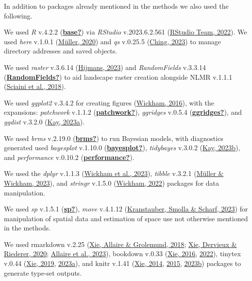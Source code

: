 \documentclass[10pt,a4paper]{article}
\begin{document}
In addition to packages already mentioned in the methods we also used the following.

We used \emph{R} v.4.2.2 (\protect\hyperlink{ref-base}{\textbf{base?}}) via \emph{RStudio} v.2023.6.2.561 (\protect\hyperlink{ref-rstudio}{RStudio Team, 2022}).
We used \emph{here} v.1.0.1 (\protect\hyperlink{ref-here}{Müller, 2020}) and \emph{qs} v.0.25.5 (\protect\hyperlink{ref-qs}{Ching, 2023}) to manage directory addresses and saved objects.

We used \emph{raster} v.3.6.14 (\protect\hyperlink{ref-raster}{Hijmans, 2023}) and \emph{RandomFields} v.3.3.14 (\protect\hyperlink{ref-RandomFields}{\textbf{RandomFields?}}) to aid landscape raster creation alongside NLMR v.1.1.1 (\protect\hyperlink{ref-NLMR}{Sciaini et al., 2018}).

We used \emph{ggplot2} v.3.4.2 for creating figures (\protect\hyperlink{ref-ggplot2}{Wickham, 2016}), with the expansions: \emph{patchwork} v.1.1.2 (\protect\hyperlink{ref-patchwork}{\textbf{patchwork?}}), \emph{ggridges} v.0.5.4 (\protect\hyperlink{ref-ggridges}{\textbf{ggridges?}}), and \emph{ggdist} v.3.2.0 (\protect\hyperlink{ref-ggdist}{Kay, 2023a}).

We used \emph{brms} v.2.19.0 (\protect\hyperlink{ref-brms}{\textbf{brms?}}) to run Bayesian models, with diagnostics generated used \emph{bayesplot} v.1.10.0 (\protect\hyperlink{ref-bayesplot}{\textbf{bayesplot?}}), \emph{tidybayes} v.3.0.2 (\protect\hyperlink{ref-tidybayes}{Kay, 2023b}), and \emph{performance} v.0.10.2 (\protect\hyperlink{ref-performance}{\textbf{performance?}}).

We used the \emph{dplyr} v.1.1.3 (\protect\hyperlink{ref-dplyr}{Wickham et al., 2023}), \emph{tibble} v.3.2.1 (\protect\hyperlink{ref-tibble}{Müller \& Wickham, 2023}),
and \emph{stringr} v.1.5.0 (\protect\hyperlink{ref-stringr}{Wickham, 2022}) packages for data manipulation.

We used \emph{sp} v.1.5.1 (\protect\hyperlink{ref-sp}{\textbf{sp?}}), \emph{move} v.4.1.12 (\protect\hyperlink{ref-move}{Kranstauber, Smolla \& Scharf, 2023}) for manipulation of spatial data and estimation of space use not otherwise mentioned in the methods.

We used rmarkdown v.2.25 (\protect\hyperlink{ref-rmarkdown2018}{Xie, Allaire \& Grolemund, 2018}; \protect\hyperlink{ref-rmarkdown2020}{Xie, Dervieux \& Riederer, 2020}; \protect\hyperlink{ref-rmarkdown2023}{Allaire et al., 2023}), bookdown v.0.33 (\protect\hyperlink{ref-bookdown2016}{Xie, 2016}, \protect\hyperlink{ref-R-bookdown}{2022}), tinytex v.0.44 (\protect\hyperlink{ref-tinytex2019}{Xie, 2019}, \protect\hyperlink{ref-tinytex2023}{2023a}), and knitr v.1.41 (\protect\hyperlink{ref-knitr2014}{Xie, 2014}, \protect\hyperlink{ref-knitr2015}{2015}, \protect\hyperlink{ref-knitr2023}{2023b}) packages to generate type-set outputs.
\end{document}
